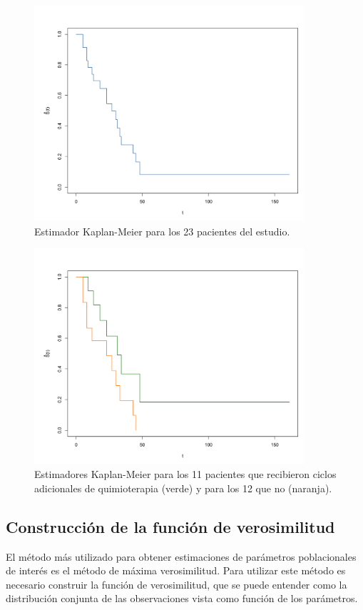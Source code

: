 \documentclass[11pt,a4paper]{article}
\begin{document}
\begin{figure}
\centering\includegraphics[width=10cm]{km1.png}
\caption{Estimador Kaplan-Meier para los 23 pacientes del estudio.}
\label{fig:km1}
\end{figure}

\begin{figure}
\centering\includegraphics[width=10cm]{km2.png}
\caption{Estimadores Kaplan-Meier para los 11 pacientes que recibieron ciclos adicionales de quimioterapia (verde) y para los 12 que no (naranja).}
\label{fig:km2}
\end{figure}

\subsection{Construcción de la función de verosimilitud}
\label{sec:ver}

El método más utilizado para obtener estimaciones de parámetros poblacionales de interés es el método de máxima verosimilitud. Para utilizar este método es necesario construir la función de verosimilitud, que se puede entender como la distribución conjunta de las observaciones vista como función de los parámetros.\\
\end{document}

